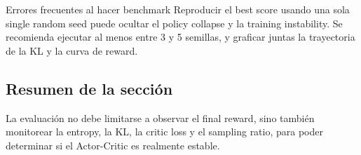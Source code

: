 \begin{knowledgebox}{Errores frecuentes al hacer benchmark}
Reproducir el best score usando una sola single random seed puede ocultar el policy collapse y la training instability. Se recomienda ejecutar al menos entre 3 y 5 semillas, y graficar juntas la trayectoria de la KL y la curva de reward.
\end{knowledgebox}

\subsection{Resumen de la sección}

La evaluación no debe limitarse a observar el final reward, sino también monitorear la entropy, la KL, la critic loss y el sampling ratio, para poder determinar si el Actor-Critic es realmente estable.

